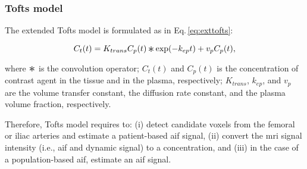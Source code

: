 \subsubsection{Tofts model}

The extended Tofts model is formulated as in Eq.\,\eqref{eq:exttofts}:

\begin{equation}
  C_t(t) = K_{trans} C_p(t) \Conv \exp(-k_{ep}t) + v_p C_p(t),
  \label{eq:exttofts}
\end{equation}

\noindent where $\Conv$ is the convolution operator; $C_t(t)$ and $C_p(t)$ is the concentration of contrast agent in the tissue and in the plasma, respectively; $K_{trans}$, $k_{ep}$, and $v_p$ are the volume transfer constant, the diffusion rate constant, and the plasma volume fraction, respectively.

Therefore, Tofts model requires to:
(i) detect candidate voxels from the femoral or iliac arteries and estimate a patient-based \ac{aif} signal,
(ii) convert the \ac{mri} signal intensity (i.e., \ac{aif} and dynamic signal) to a concentration, and
(iii) in the case of a population-based \ac{aif}, estimate an \ac{aif} signal.


